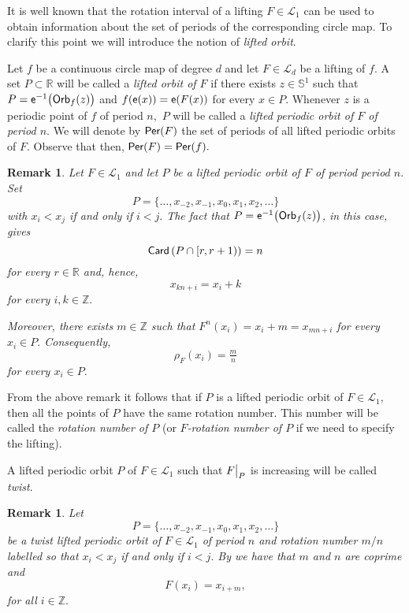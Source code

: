 \documentclass[a4paper, 11pt]{amsart}
\numberwithin{equation}{section}
\theoremstyle{customnumberedtheorem}
\theoremstyle{definitionwithbfnote}
\newtheorem{remark}[theorem]{Remark}
\newcommand{\Z}{\ensuremath{\mathbb{Z}}}
\newcommand{\R}{\ensuremath{\mathbb{R}}}
\newcommand{\SI}{\ensuremath{\mathbb{S}^1}}
\DeclareMathOperator{\Per}{\textsf{\upshape Per}}
\DeclareMathOperator{\Orb}{\textsf{\upshape Orb}}
\DeclareMathOperator{\Card}{\textsf{\upshape Card}}
\DeclareMathOperator{\eexp}{\textsf{\upshape e}}
\newcommand{\dol}[1][1]{\ensuremath{\mathcal{L}_{#1}}}
\newcommand{\emap}[1]{\ensuremath{\eexp(#1)}}
\newcommand{\evalat}[1]{\bigr\rvert\sb{#1}}
\begin{document}
It is well known that the rotation interval of a lifting $F \in \dol$
can be used to obtain information about the set of periods of the
corresponding circle map.
To clarify this point we will introduce the notion of \emph{lifted orbit\/}.

Let $f$ be a continuous circle map of degree $d$ and let $F\in \dol[d]$
be a lifting of $f$. A set $P\subset \R$ will be called a
\emph{lifted orbit of $F$ \/} if there exists $z \in \SI$ such that
$P = \eexp^{-1}\bigl(\Orb_f(z)\bigr)$ and
$f(\emap{x})=\emap{F(x)}$ for every $x \in P.$
Whenever $z$ is a periodic point of $f$ of period $n,$
$P$ will be called a \emph{lifted periodic orbit of $F$ of period $n$}.
We will denote by $\Per(F)$ the set of periods of all
lifted periodic orbits of $F.$ Observe that then, $\Per(F) = \Per(f).$

\begin{remark}
Let $F\in \dol$ and let $P$ be a lifted periodic orbit of $F$ of
period period $n.$ Set
\[
  P = \{\dots, x_{-2}, x_{-1},x_0, x_1, x_2,\dots\}
\]
with $x_i < x_j$ if and only if $i < j.$
The fact that $P = \eexp^{-1}\bigl(\Orb_f(z)\bigr)$, in this case, gives
\[
 \Card\left(P \cap [r,r+1)\right) = n
\]
for every $r \in \R$ and, hence,
\[
  x_{kn + i}=x_i + k
\]
for every $i, k \in \Z.$

Moreover, there exists $m \in \Z$ such that
$F^n(x_i) = x_i + m = x_{mn + i}$ for every $x_i \in P.$
Consequently,
\[
 \rho_F (x_i) = \tfrac{m}{n}
\]
for every $x_i \in P.$
\end{remark}

From the above remark it follows that if $P$ is a lifted periodic orbit
of $F \in \dol,$ then all the points of $P$ have the same rotation number.
This number will be called the \emph{rotation number of $P$ \/}
(or \emph{$F$-rotation number of $P$ \/} if we need to specify the lifting).

A lifted periodic orbit $P$ of $F \in \dol$
such that $F\evalat{P}$ is increasing
will be called \emph{twist\/}.

\begin{remark}\label{rem:liftedperiodicorbitandtwist}
Let
\[
  P = \{\dots, x_{-2}, x_{-1},x_0, x_1, x_2,\dots\}
\]
be a twist lifted periodic orbit of $F \in \dol$
of period $n$ and rotation number $m/n$ labelled so that
$x_i < x_j$ if and only if $i < j.$
By \cite[Lemma~3.7.4 and Corollary~3.7.6]{alm} we have that
$m$ and $n$ are coprime and
\[
  F(x_i) = x_{i + m},
\]
for all $i\in \Z.$
\end{remark}
\end{document}
